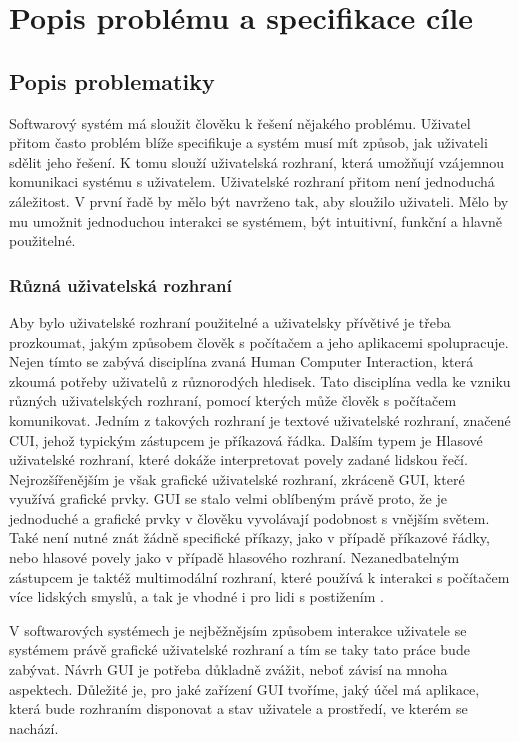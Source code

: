 \chapter{Popis problému a specifikace cíle}
\section{Popis problematiky}

Softwarový systém má sloužit člověku k řešení nějakého problému. Uživatel přitom často problém blíže specifikuje a systém musí mít způsob, jak uživateli sdělit jeho řešení. K tomu slouží uživatelská rozhraní, která umožňují vzájemnou komunikaci systému s uživatelem. Uživatelské rozhraní přitom není jednoduchá záležitost. V první řadě by mělo být navrženo tak, aby sloužilo uživateli. Mělo by mu umožnit jednoduchou interakci se systémem, být intuitivní, funkční a hlavně použitelné. 


\subsection{Různá uživatelská rozhraní}
Aby bylo uživatelské rozhraní použitelné a uživatelsky přívětivé je třeba prozkoumat, jakým způsobem člověk s počítačem a jeho aplikacemi spolupracuje. Nejen tímto se zabývá disciplína zvaná Human Computer Interaction, která zkoumá potřeby uživatelů z různorodých hledisek. Tato disciplína vedla ke vzniku různých uživatelských rozhraní, pomocí kterých může člověk s počítačem komunikovat. Jedním z takových rozhraní je textové uživatelské rozhraní, značené CUI, jehož typickým zástupcem je příkazová řádka. Dalším typem je Hlasové uživatelské rozhraní, které dokáže interpretovat povely zadané lidskou řečí. Nejrozšířenějším je však grafické uživatelské rozhraní, zkráceně GUI, které využívá grafické prvky. GUI se stalo velmi oblíbeným právě proto, že je jednoduché a grafické prvky v člověku vyvolávají podobnost s vnějším světem. Také není nutné znát žádně specifické příkazy, jako v případě příkazové řádky, nebo hlasové povely jako v případě hlasového rozhraní. Nezanedbatelným zástupcem je taktéž multimodální rozhraní, které používá k interakci s počítačem více lidských smyslů, a tak je vhodné i pro lidi s postižením \cite{uiTypes}. 

V softwarových systémech je nejběžnějsím způsobem interakce uživatele se systémem právě grafické uživatelské rozhraní a tím se taky tato práce bude zabývat. Návrh GUI je potřeba důkladně zvážit, neboť závisí na mnoha aspektech. Důležité je, pro jaké zařízení GUI tvoříme, jaký účel má aplikace, která bude rozhraním disponovat a stav uživatele a prostředí, ve kterém se nachází. 

